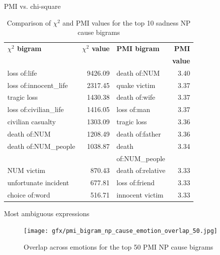 \documentclass[11pt]{beamer}
\begin{document}
\begin{frame}{PMI vs. chi-square}


\begin{table}[h]
\centering
\begin{tabular}{l|r|l|r}
{\bf $\chi^{2}$ bigram} & {\bf $\chi^{2}$ value} & {\bf PMI bigram}        & {\bf PMI} \\
& & & {\bf value}\\\hline 
loss of:life            & 9426.09                & death of:NUM         & 3.40            \\
loss of:innocent\_life  & 2317.45                & quake victim            & 3.37            \\
tragic loss             & 1430.38                & death of:wife           & 3.37            \\
loss of:civilian\_life  & 1416.05                & loss of:man             & 3.37            \\
civilian casualty       & 1303.09                & tragic loss             & 3.36            \\
death of:NUM            & 1208.49                & death of:father         & 3.36            \\
death of:NUM\_people & 1038.87                & death  & 3.34            \\
& & of:NUM\_people & \\
NUM victim           & 870.43                 & death of:relative       & 3.33            \\
unfortunate incident    & 677.81                 & loss of:friend          & 3.33            \\
choice of:word          & 516.71                 & innocent victim         & 3.33           
\end{tabular}
\caption{Comparison of $\chi^{2}$ and PMI values for the top 10 sadness NP cause bigrams}
\label{tab:chi-pmi sadness}
\end{table}
\end{frame}

\begin{frame}{Most ambiguous expressions}

\begin{figure}[bth]
\texttt{[image: gfx/pmi\_bigram\_np\_cause\_emotion\_overlap\_50.jpg]}
\caption{Overlap across emotions for the top 50 PMI NP cause bigrams}\label{fig:pmi-bigram-np-cause-emotion-overlap-50}
\end{figure}

\end{frame}
\end{document}
